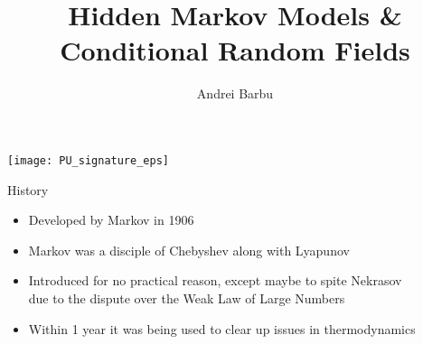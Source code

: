 \documentclass[english]{beamer} %
\begin{document}
\title[HMMs \& CRFs]{Hidden Markov Models \&\\
Conditional Random Fields}

\author{Andrei Barbu}

\begin{frame}
  \titlepage
  \begin{center}
    \texttt{[image: PU\_signature\_eps]}
  \end{center}
\end{frame}

\newcommand{\Gaussian}{\rput(0,-0.35){\psset{yunit=0.8cm,xunit=0.3}
     \psGauss[linecolor=red, linewidth=0.8pt, sigma=0.5]{-1.5}{1.5}}}
\def\dedge{\ncline[linestyle=dashed]}
\def\omitnode{\Tr*[edge=\dedge]{}}

\begin{frame}[<+->]{History}
\begin{itemize}
\item Developed by Markov in 1906
\item Markov was a disciple of Chebyshev  along with Lyapunov
\item Introduced for no practical reason, except maybe to spite Nekrasov\\
due to the dispute over the Weak Law of Large Numbers
\item Within 1 year it was being used to clear up issues in thermodynamics
\end{itemize}
\end{frame}
\end{document}
